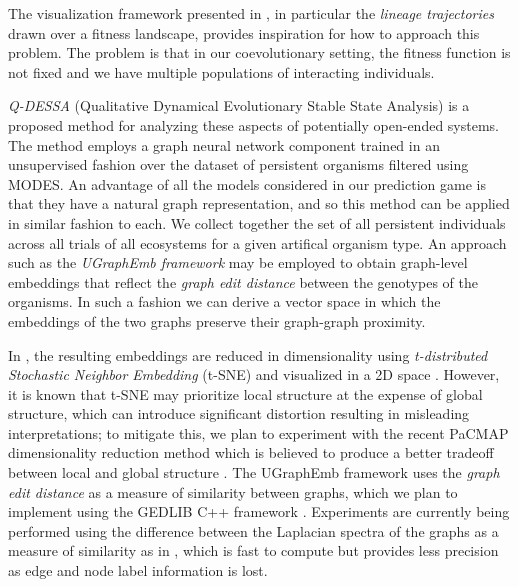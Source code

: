 \documentclass{article}
\begin{document}
The visualization framework presented in \cite{dolson2020}, in particular the \textit{lineage trajectories} 
drawn over a fitness landscape, provides inspiration for how to approach this problem. The 
problem is that in our coevolutionary setting, the fitness function is not fixed and we have
multiple populations of interacting individuals.

\textit{Q-DESSA} (Qualitative Dynamical Evolutionary Stable State Analysis) is a proposed method for 
analyzing these aspects of potentially open-ended systems. The method employs a graph neural
network component trained in an unsupervised fashion over the dataset of persistent organisms 
filtered using MODES. An advantage of all the models considered in our prediction game is that 
they have a natural graph representation, and so this method can be applied 
in similar fashion to each. We collect together the set of all persistent individuals across all trials of all
ecosystems for a given artifical organism type. An approach such as the \textit{UGraphEmb framework}
\citep{Ding2019UNSUPERVISEDIW} may be employed to obtain graph-level embeddings that
reflect the \textit{graph edit distance} between the genotypes of the organisms. In such a fashion we can
derive a vector space in which the embeddings of the two graphs preserve their graph-graph 
proximity.

In \cite{Ding2019UNSUPERVISEDIW}, the resulting embeddings are reduced in dimensionality using 
\textit{t-distributed Stochastic Neighbor Embedding} (t-SNE) and visualized in a 
2D space \citep{van2008visualizing}. However, it is known that t-SNE may prioritize local structure
at the expense of global structure, which can introduce significant distortion resulting in 
misleading interpretations; to mitigate this, we plan to experiment with the recent PaCMAP
dimensionality reduction method which is believed to produce a better tradeoff between local and
global structure \citep{wang2021}. The UGraphEmb framework uses the \textit{graph edit distance}
as a measure of similarity between graphs, which we plan to implement using the GEDLIB C++
framework \citep{Blumenthal2019GEDLIBAC}. Experiments are currently being performed using the 
difference between the Laplacian spectra of the graphs as a measure of similarity as in 
\cite{deLang2014}, which is fast to compute but provides less precision as edge and node label
information is lost.
\end{document}
